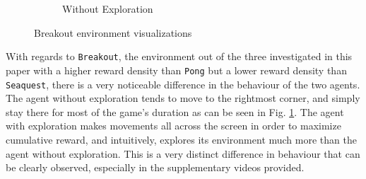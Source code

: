 \documentclass{article}
\begin{document}
\begin{figure}
\begin{subfigure}{.5\textwidth}
  \caption{Without Exploration}
\end{subfigure}
\caption{Breakout environment visualizations}
\label{fig:breakout}
\end{figure}
With regards to \texttt{Breakout}, the environment out of the three investigated in this paper with a higher reward density than \texttt{Pong} but a lower reward density than \texttt{Seaquest}, there is a very noticeable difference in the behaviour of the two agents. The agent without exploration tends to move to the rightmost corner, and simply stay there for most of the game’s duration as can be seen in Fig. \ref{fig:breakout}. The agent with exploration makes movements all across the screen in order to maximize cumulative reward, and intuitively, explores its environment much more than the agent without exploration. This is a very distinct difference in behaviour that can be clearly observed, especially in the supplementary videos provided.
\end{document}
